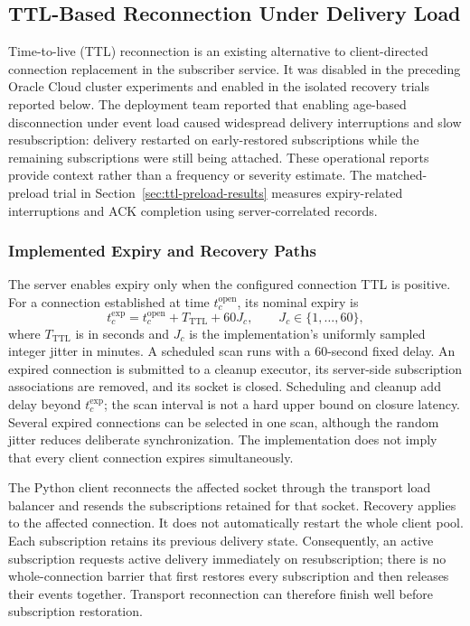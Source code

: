 \subsection{TTL-Based Reconnection Under Delivery Load}
\label{sec:ttl-reconnection}

Time-to-live (TTL) reconnection is an existing alternative to client-directed
connection replacement in the subscriber service. It was disabled in the
preceding Oracle Cloud cluster experiments and enabled in the isolated
recovery trials reported below. The deployment
team reported that enabling age-based disconnection under event load caused
widespread delivery interruptions and slow resubscription: delivery restarted
on early-restored subscriptions while the remaining subscriptions were still
being attached. These operational reports provide context rather than a
frequency or severity estimate. The matched-preload trial in
Section~\ref{sec:ttl-preload-results} measures
expiry-related interruptions and ACK completion using server-correlated records.

\subsubsection{Implemented Expiry and Recovery Paths}

The server enables expiry only when the configured connection TTL is positive.
For a connection established at time $t_c^{\mathrm{open}}$, its nominal expiry is
\[
 t_c^{\mathrm{exp}}=t_c^{\mathrm{open}}+T_{\mathrm{TTL}}+60J_c,
 \qquad J_c\in\{1,\ldots,60\},
\]
where $T_{\mathrm{TTL}}$ is in seconds and $J_c$ is the implementation's
uniformly sampled integer jitter in minutes. A scheduled scan runs with a
60-second fixed delay. An expired connection is submitted to a cleanup
executor, its server-side subscription associations are removed, and its
socket is closed. Scheduling and cleanup add delay beyond $t_c^{\mathrm{exp}}$; the scan
interval is not a hard upper bound on closure latency. Several expired
connections can be selected in one scan, although the random jitter reduces
deliberate synchronization. The implementation does not imply that every
client connection expires simultaneously.

The Python client reconnects the affected socket through the transport load
balancer and resends the subscriptions retained for that socket. Recovery applies to the affected connection. It does not automatically
restart the whole client pool. Each
subscription retains its previous delivery state. Consequently, an active
subscription requests active delivery immediately on resubscription; there is
no whole-connection barrier that first restores every subscription and then
releases their events together. Transport reconnection can therefore finish
well before subscription restoration.

